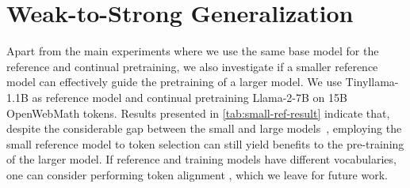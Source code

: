 \section{Weak-to-Strong Generalization}


Apart from the main experiments where we use the same base model for the reference and continual pretraining, we also investigate if a smaller reference model can effectively guide the pretraining of a larger model.
We use Tinyllama-1.1B as reference model and continual pretraining Llama-2-7B on 15B OpenWebMath tokens.
Results presented in \autoref{tab:small-ref-result} indicate that, despite the considerable gap between the small and large models~\citep{contrastivedecoding23}, employing the small reference model to token selection can still yield benefits to the pre-training of the larger model.
If reference and training models have different vocabularies, one can consider performing token alignment \citep{wan2024knowledge, fu2023specializing}, which we leave for future work.
